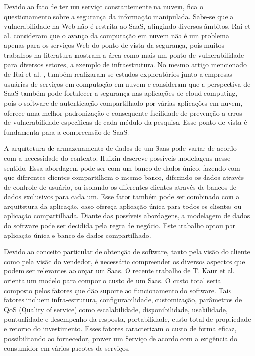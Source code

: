 Devido ao fato de ter um serviço constantemente na nuvem, fica o questionamento sobre a segurança da informação manipulada. Sabe-se que a vulnerabilidade na Web não é restrita ao SaaS, atingindo diversos âmbitos. Rai et al. \cite{journals/corr/RaiSM13} consideram que o avanço da computação em nuvem não é um problema apenas para os serviços Web do ponto de vista da segurança, pois muitos trabalhos na literatura mostram a área como mais um ponto de vulnerabilidade para diversos setores, a exemplo de infraestrutura. No mesmo artigo mencionado de Rai et al. \cite{journals/corr/RaiSM13}, também realizaram-se estudos exploratórios junto a empresas usuárias de serviços em computação em nuvem e consideram que a perspectiva de SaaS também pode fortalecer a segurança nas aplicações de cloud computing, pois o software de autenticação compartilhado por várias aplicações em nuvem, oferece uma melhor padronização e consequente facilidade de prevenção a erros de vulnerabilidade específicas de cada módulo da pesquisa. Esse ponto de vista é fundamenta para a compreensão de SaaS.


A arquitetura de armazenamento de dados de um Saas pode variar de acordo com a necessidade do contexto. Huixin \cite{7586486} descreve possíveis modelagens nesse sentido. Essa abordagem pode ser com um banco de dados único, fazendo com que diferentes clientes compartilhem o mesmo banco, diferindo os dados através de controle de usuário, ou isolando os diferentes clientes através de bancos de dados exclusivos para cada um. Esse fator também pode ser combinado com a arquitetura da aplicação, caso ofereça aplicação única para todos os clientes ou aplicação compartilhada. Diante das possíveis abordagens, a modelagem de dados do software pode ser decidida pela regra de negócio. Este trabalho optou por aplicação única e banco de dados compartilhado.

Devido ao conceito particular de obtenção de software, tanto pela visão do cliente como pela visão do vendedor, é necessário compreender os diversos aspectos que podem ser relevantes ao orçar um Saas. O recente trabalho de T. Kaur et al. \citep{6949281} orienta um modelo para compor o custo de um Saas. O custo total seria composto pelos fatores que dão suporte ao funcionamento do software. Tais fatores incluem infra-estrutura, configurabilidade, customização, parâmetros de QoS (Quality of service) como escalabilidade, disponibilidade, usabilidade, pontualidade e desempenho da resposta, portabilidade, custo total de propriedade e retorno do investimento. Esses fatores caracterizam o custo de forma eficaz, possibilitando ao fornecedor, prover um Serviço de acordo com a exigência do consumidor em vários pacotes de serviços.


